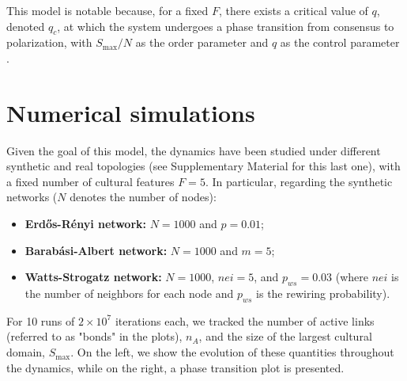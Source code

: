This model is notable because, for a fixed $F$, there exists a critical value of $q$, denoted $q_c$, at which the system undergoes a phase transition from consensus to polarization, with $S_{\max}/N$ as the order parameter and $q$ as the control parameter \cite{axelrod_phase_transition}.

\section{Numerical simulations}
Given the goal of this model, the dynamics have been studied under different synthetic and real topologies (see Supplementary Material for this last one), with a fixed number of cultural features $F = 5$. In particular, regarding the synthetic networks ($N$ denotes the number of nodes):
\begin{itemize}
    \item \textbf{Erd\H{o}s-Rényi network:} $N = 1000$ and $p = 0.01$;
    \item \textbf{Barab\'asi-Albert network:} $N = 1000$ and $m = 5$;
    \item \textbf{Watts-Strogatz network:} $N = 1000$, $nei = 5$, and $p_{ws} = 0.03$ (where $nei$ is the number of neighbors for each node and $p_{ws}$ is the rewiring probability).
\end{itemize}
For 10 runs of $2 \times 10^7$ iterations each, we tracked the number of active links (referred to as "bonds" in the plots), $n_A$, and the size of the largest cultural domain, $S_{\max}$. On the left, we show the evolution of these quantities throughout the dynamics, while on the right, a phase transition plot is presented.

